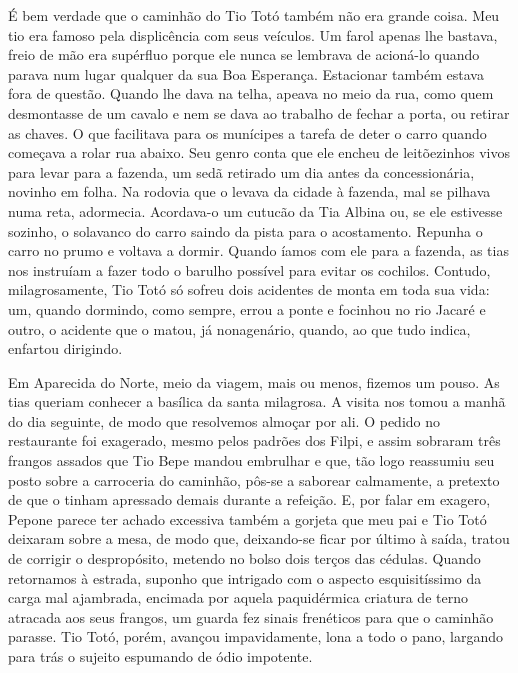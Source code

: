 É bem verdade que o caminhão do Tio Totó também não era grande coisa.
Meu tio era famoso pela displicência com seus veículos.
Um farol apenas lhe bastava, freio de mão era supérfluo porque ele nunca se lembrava de acioná-lo quando parava num lugar qualquer da sua Boa Esperança.
Estacionar também estava fora de questão.
Quando lhe dava na telha, apeava no meio da rua, como quem desmontasse de um cavalo e nem se dava ao trabalho de fechar a porta, ou retirar as chaves.
O que facilitava para os munícipes a tarefa de deter o carro quando começava a rolar rua abaixo.
Seu genro conta que ele encheu de leitõezinhos vivos para levar para a fazenda, um sedã retirado um dia antes da concessionária, novinho em folha.
Na rodovia que o levava da cidade à fazenda, mal se pilhava numa reta, adormecia.
Acordava-o um cutucão da Tia Albina ou, se ele estivesse sozinho, o solavanco do carro saindo da pista para o acostamento.
Repunha o carro no prumo e voltava a dormir.
Quando íamos com ele para a fazenda, as tias nos instruíam a fazer todo o barulho possível para evitar os cochilos.
Contudo, milagrosamente, Tio Totó só sofreu dois acidentes de monta em toda sua vida: um, quando dormindo, como sempre, errou a ponte e focinhou no rio Jacaré e outro, o acidente que o matou, já nonagenário, quando, ao que tudo indica, enfartou dirigindo.

 
Em Aparecida do Norte, meio da viagem, mais ou menos, fizemos um pouso.
As tias queriam conhecer a basílica da santa milagrosa.
A visita nos tomou a manhã do dia seguinte, de modo que resolvemos almoçar por ali.
O pedido no restaurante foi exagerado, mesmo pelos padrões dos Filpi, e assim sobraram três frangos assados que Tio Bepe mandou embrulhar e que, tão logo reassumiu seu posto sobre a carroceria do caminhão, pôs-se a saborear calmamente, a pretexto de que o tinham apressado demais durante a refeição.
E, por falar em exagero, Pepone parece ter achado excessiva também a gorjeta que meu pai e Tio Totó deixaram sobre a mesa, de modo que, deixando-se ficar por último à saída, tratou de corrigir o despropósito, metendo no bolso dois terços das cédulas.
Quando retornamos à estrada, suponho que intrigado com o aspecto esquisitíssimo da carga mal ajambrada, encimada por aquela paquidérmica criatura de terno atracada aos seus frangos, um guarda fez sinais frenéticos para que o caminhão parasse.
Tio Totó, porém, avançou impavidamente, lona a todo o pano, largando para trás o sujeito espumando de ódio impotente.

